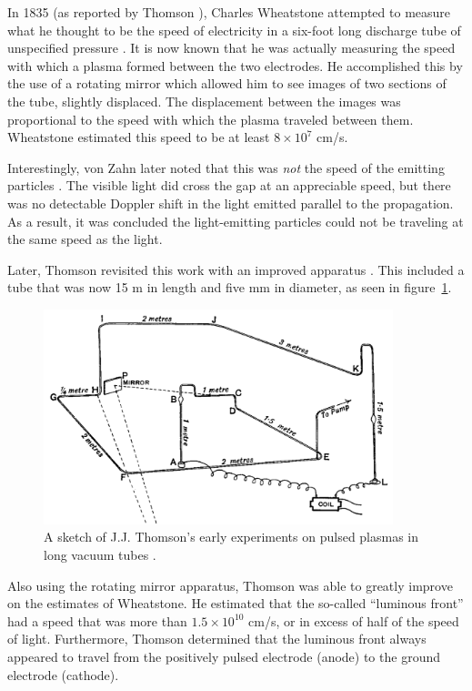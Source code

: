 In 1835 (as reported by Thomson \cite{Thomson1893}), Charles Wheatstone
attempted to measure what he thought to be the speed of electricity in a
six-foot long discharge tube of unspecified pressure \cite{Wheatstone1835}. It
is now known that he was actually measuring the speed with which a plasma formed
between the two electrodes. He accomplished this by the use of a rotating mirror
which allowed him to see images of two sections of the tube, slightly displaced.
The displacement between the images was proportional to the speed with which the
plasma traveled between them. Wheatstone estimated this speed to be at least
$8\times10^7$ cm/s.

Interestingly, von Zahn later noted that this was \emph{not} the speed of the
emitting particles \cite{Zahn1879}. The visible light did cross the gap at an
appreciable speed, but there was no detectable Doppler shift in the light
emitted parallel to the propagation. As a result, it was concluded the
light-emitting particles could not be traveling at the same speed as the light.

Later, Thomson revisited this work with an improved apparatus
\cite{Thomson1893}. This included a tube that was now 15 m in length and five mm
in diameter, as seen in figure~\ref{fig:thomson}.
\begin{figure}
  \centering
  \includegraphics[width=4in]{chapters/introduction/figures/thomson.png}
  \caption{A sketch of J.J. Thomson's early experiments on pulsed plasmas 
  in long vacuum tubes \cite{Thomson1893}.}\label{fig:thomson}
\end{figure}
Also using the rotating mirror apparatus, Thomson was able to greatly improve on
the estimates of Wheatstone. He estimated that the so-called ``luminous front''
had a speed that was more than $1.5\times10^{10}$ cm/s, or in excess of half of
the speed of light. Furthermore, Thomson determined that the luminous front
always appeared to travel from the positively pulsed electrode (anode) to the
ground electrode (cathode).

